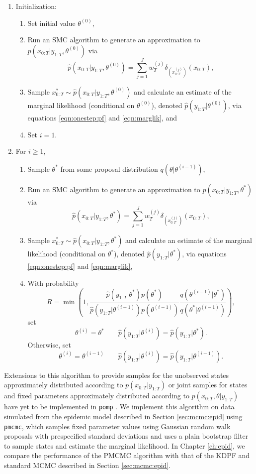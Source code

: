 \begin{enumerate}
\item Initialization:
\begin{enumerate}
\item Set initial value $\theta^{(0)}$,
\item Run an SMC algorithm to generate an approximation to $p(x_{0:T}|y_{1:T},\theta^{(0)})$ via
    \[\hat{p}(x_{0:T}|y_{1:T},\theta^{(0)}) = \sum_{j=1}^J w_T^{(j)} \delta_{\left(x_{0:T}^{(j)}\right)}(x_{0:T}),\]
\item Sample $x_{0:T}^* \sim \hat{p}(x_{0:T}|y_{1:T},\theta^{(0)})$ and calculate an estimate of the marginal likelihood (conditional on $\theta^{(0)}$), denoted $\hat{p}(y_{1:T}|\theta^{(0)})$, via equations \eqref{eqn:onestep:pf} and \eqref{eqn:marglik}, and
\item Set $i = 1$.
\end{enumerate}
\item For $i \ge 1$,
\begin{enumerate}
\item Sample $\theta^*$ from some proposal distribution $q(\theta|\theta^{(i-1)})$,
\item Run an SMC algorithm to generate an approximation to $p(x_{0:T}|y_{1:T},\theta^*)$ via
    \[\hat{p}(x_{0:T}|y_{1:T},\theta^*) = \sum_{j=1}^J w_T^{(j)} \delta_{\left(x_{0:T}^{(j)}\right)}(x_{0:T}),\]
\item Sample $x_{0:T}^* \sim \hat{p}(x_{0:T}|y_{1:T},\theta^*)$ and calculate an estimate of the marginal likelihood (conditional on $\theta^*$), denoted $\hat{p}(y_{1:T}|\theta^*)$, via equations \eqref{eqn:onestep:pf} and \eqref{eqn:marglik},
\item With probability
    \[R = \min\left(1, \frac{\hat{p}(y_{1:T}|\theta^*)p(\theta^*)}{\hat{p}(y_{1:T}|\theta^{(i-1)})p(\theta^{(i-1)})} \frac{q(\theta^{(i-1)}|\theta^*)}{q(\theta^*|\theta^{(i-1)})} \right),\]
    set
    \[\theta^{(i)} = \theta^* \qquad \hat{p}(y_{1:T}|\theta^{(i)}) = \hat{p}(y_{1:T}|\theta^*).\]
    Otherwise, set
    \[\theta^{(i)} = \theta^{(i-1)} \qquad \hat{p}(y_{1:T}|\theta^{(i)}) = \hat{p}(y_{1:T}|\theta^{(i-1)}).\]
\end{enumerate}
\end{enumerate}

Extensions to this algorithm to provide samples for the unobserved states approximately distributed according to $p(x_{0:T}|y_{1:T})$ or joint samples for states and fixed parameters approximately distributed according to $p(x_{0:T},\theta|y_{1:T})$ have yet to be implemented in {\tt pomp} \cite[see Section 2.4.3][]{Andr:Douc:Hol:pmcmc:2010}. We implement this algorithm on data simulated from the epidemic model described in Section \ref{sec:mcmc:epid} using {\tt pmcmc}, which samples fixed parameter values using Gaussian random walk proposals with prespecified standard deviations and uses a plain bootstrap filter to sample states and estimate the marginal likelihood. In Chapter \ref{ch:epid}, we compare the performance of the PMCMC algorithm with that of the KDPF and standard MCMC described in Section \ref{sec:mcmc:epid}. 
